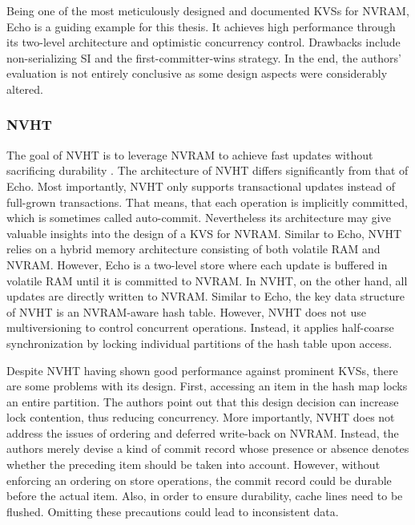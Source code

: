 Being one of the most meticulously designed and documented \acp{KVS} for
\ac{NVRAM}, Echo is a guiding example for this thesis. It achieves high
performance through its two-level architecture and optimistic concurrency
control. Drawbacks include non-serializing \ac{SI} and the first-committer-wins
strategy. In the end, the authors' evaluation is not entirely conclusive as some
design aspects were considerably altered.

\subsubsection{NVHT}

The goal of NVHT is to leverage \ac{NVRAM} to achieve fast updates without
sacrificing durability \cite{zhou2016nvht}. The architecture of NVHT differs
significantly from that of Echo. Most importantly, NVHT only supports
transactional updates instead of full-grown transactions. That means, that each
operation is implicitly committed, which is sometimes called auto-commit.
Nevertheless its architecture may give valuable insights into the design of a
\ac{KVS} for \ac{NVRAM}. Similar to Echo, NVHT relies on a hybrid memory
architecture consisting of both volatile \ac{RAM} and \ac{NVRAM}. However, Echo
is a two-level store where each update is buffered in volatile \ac{RAM} until it
is committed to \ac{NVRAM}. In NVHT, on the other hand, all updates are directly
written to \ac{NVRAM}. Similar to Echo, the key data structure of NVHT is an
\ac{NVRAM}-aware hash table. However, NVHT does not use multiversioning to
control concurrent operations. Instead, it applies half-coarse synchronization
by locking individual partitions of the hash table upon access.

Despite NVHT having shown good performance against prominent \acp{KVS}, there
are some problems with its design. First, accessing an item in the hash map
locks an entire partition. The authors point out that this design decision can
increase lock contention, thus reducing concurrency. More importantly, NVHT does
not address the issues of ordering and deferred write-back on \ac{NVRAM}.
Instead, the authors merely devise a kind of commit record whose presence or
absence denotes whether the preceding item should be taken into account.
However, without enforcing an ordering on store operations, the commit record
could be durable before the actual item. Also, in order to ensure durability,
cache lines need to be flushed. Omitting these precautions could lead to
inconsistent data.

